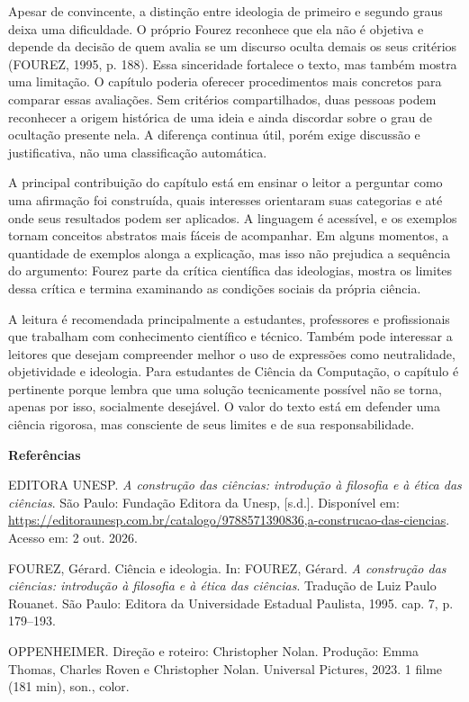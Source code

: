 \documentclass[12pt,a4paper]{article}
\begin{document}
Apesar de convincente, a distinção entre ideologia de primeiro e segundo graus deixa uma dificuldade. O próprio Fourez reconhece que ela não é objetiva e depende da decisão de quem avalia se um discurso oculta demais os seus critérios (FOUREZ, 1995, p. 188). Essa sinceridade fortalece o texto, mas também mostra uma limitação. O capítulo poderia oferecer procedimentos mais concretos para comparar essas avaliações. Sem critérios compartilhados, duas pessoas podem reconhecer a origem histórica de uma ideia e ainda discordar sobre o grau de ocultação presente nela. A diferença continua útil, porém exige discussão e justificativa, não uma classificação automática.

A principal contribuição do capítulo está em ensinar o leitor a perguntar como uma afirmação foi construída, quais interesses orientaram suas categorias e até onde seus resultados podem ser aplicados. A linguagem é acessível, e os exemplos tornam conceitos abstratos mais fáceis de acompanhar. Em alguns momentos, a quantidade de exemplos alonga a explicação, mas isso não prejudica a sequência do argumento: Fourez parte da crítica científica das ideologias, mostra os limites dessa crítica e termina examinando as condições sociais da própria ciência.

A leitura é recomendada principalmente a estudantes, professores e profissionais que trabalham com conhecimento científico e técnico. Também pode interessar a leitores que desejam compreender melhor o uso de expressões como neutralidade, objetividade e ideologia. Para estudantes de Ciência da Computação, o capítulo é pertinente porque lembra que uma solução tecnicamente possível não se torna, apenas por isso, socialmente desejável. O valor do texto está em defender uma ciência rigorosa, mas consciente de seus limites e de sua responsabilidade.

\begin{center}
\textbf{\large Referências}
\end{center}
\vspace{6pt}

\begin{singlespace}
\sloppy
\noindent\setlength{\parindent}{0pt}%
EDITORA UNESP. \textit{A construção das ciências: introdução à filosofia e à ética das ciências}. São Paulo: Fundação Editora da Unesp, [s.d.]. Disponível em: \url{https://editoraunesp.com.br/catalogo/9788571390836,a-construcao-das-ciencias}. Acesso em: 2 out. 2026.

\par\vspace{6pt}\noindent
FOUREZ, Gérard. Ciência e ideologia. In: FOUREZ, Gérard. \textit{A construção das ciências: introdução à filosofia e à ética das ciências}. Tradução de Luiz Paulo Rouanet. São Paulo: Editora da Universidade Estadual Paulista, 1995. cap. 7, p. 179--193.

\par\vspace{6pt}\noindent
OPPENHEIMER. Direção e roteiro: Christopher Nolan. Produção: Emma Thomas, Charles Roven e Christopher Nolan. Universal Pictures, 2023. 1 filme (181 min), son., color.
\end{singlespace}
\end{document}
